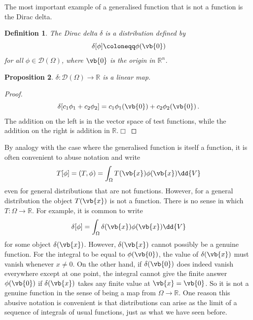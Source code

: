 \documentclass{article}
\theoremstyle{plain}\theoremheaderfont{\normalfont\itshape}\theorembodyfont{\rmfamily}\theoremseparator{.}\newtheorem*{rem}{Remark}\newtheorem*{ex}{Example}\newtheorem*{proof}{Proof}\newtheorem*{altp}{Alternative proof}
\theoremstyle{plain}\theoremheaderfont{\normalfont\bfseries}\theorembodyfont{\rmfamily}\theoremseparator{.}\newtheorem{thm}{Theorem}[section]\newtheorem{lem}[thm]{Lemma}\newtheorem{prop}[thm]{Proposition}\newtheorem*{cor}{Corollary}\newtheorem{defn}[thm]{Definition}\newtheorem{clm}[thm]{Claim}\newtheorem{clminproof}{Claim}
\theoremstyle{break}\theoremheaderfont{\normalfont\itshape}\theorembodyfont{\rmfamily}\theoremseparator{.\medskip}\newtheorem*{proofskip}{Proof}\newtheorem*{exs}{Examples}\newtheorem*{rems}{Remarks}
\theoremstyle{break}\theoremheaderfont{\normalfont\bfseries}\theorembodyfont{\rmfamily}\theoremseparator{.\medskip}\newtheorem{lemskip}[thm]{Lemma}\newtheorem{defnskip}[thm]{Definition}\newtheorem{propskip}[thm]{Proposition}\newtheorem{thmskip}[thm]{Theorem}
\numberwithin{equation}{section}
\newcommand{\qed}{\hfill\ensuremath{\Box}}
\begin{document}
	The most important example of a generalised function that is not a function is the Dirac delta.
	\begin{defn}
		The \textit{Dirac delta} \(\delta\) is a distribution defined by
		\[\delta[\phi]\coloneqq\phi(\vb{0})\]
		for all \(\phi\in\mathcal{D}(\Omega)\), where \(\vb{0}\) is the origin in \(\mathbb{R}^n\).
	\end{defn}
	\begin{prop}
		\(\delta:\mathcal{D}(\Omega)\to\mathbb{R}\) is a linear map.
	\end{prop}
	\begin{proof}
		\[\delta[c_1\phi_1+c_2\phi_2]=c_1\phi_1(\vb{0})+c_2\phi_2(\vb{0})\,.\]
		The addition on the left is in the vector space of test functions, while the addition on the right is addition in \(\mathbb{R}\).\qed
	\end{proof}
	By analogy with the case where the generalised function is itself a function, it is often convenient to abuse notation and write
	\[T[\phi]=(T,\phi)=\int_\Omega T(\vb{x})\phi(\vb{x})\dd{V}\]
	even for general distributions that are not functions. However, for a general distribution the object \(T(\vb{x})\) is not a function. There is no sense in which \(T:\Omega\to\mathbb{R}\). For example, it is common to write
	\[\delta[\phi]=\int_\Omega\delta(\vb{x})\phi(\vb{x})\dd{V}\]
	for some object \(\delta(\vb{x})\). However, \(\delta(\vb{x})\) cannot possibly be a genuine function. For the integral to be equal to \(\phi(\vb{0})\), the value of \(\delta(\vb{x})\) must vanish whenever \(x\ne 0\). On the other hand, if \(\delta(\vb{0})\) does indeed vanish everywhere except at one point, the integral cannot give the finite answer \(\phi(\vb{0})\) if \(\delta(\vb{x})\) takes any finite value at \(\vb{x}=\vb{0}\). So it is not a genuine function in the sense of being a map from \(\Omega\to\mathbb{R}\). One reason this abusive notation is convenient is that distributions can arise as the limit of a sequence of integrals of usual functions, just as what we have seen before.
\end{document}
